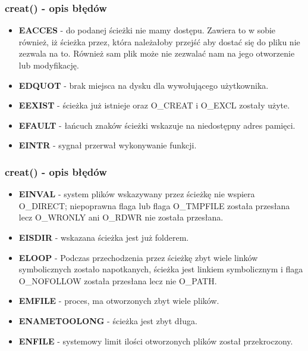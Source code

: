 \documentclass{beamer}
\begin{document}
\begin{frame}
	\frametitle{creat() - opis błędów}
\begin{itemize}
\item \textbf{EACCES} - do podanej ścieżki nie mamy dostępu. Zawiera to w sobie również,
iż ścieżka przez, która należałoby przejść aby dostać się do pliku nie zezwala na to.
Również sam plik może nie zezwalać nam na jego otworzenie lub modyfikację.
\item \textbf{EDQUOT} - brak miejsca na dysku dla wywołującego użytkownika.
\item \textbf{EEXIST} - ścieżka już istnieje oraz O\_CREAT i O\_EXCL zostały użyte.
\item \textbf{EFAULT} - łańcuch znaków ścieżki wskazuje na niedostępny adres pamięci.
\item \textbf{EINTR} - sygnał przerwał wykonywanie funkcji.
\end{itemize}
\end{frame}

\begin{frame}
	\frametitle{creat() - opis błędów}
	\begin{itemize}
\item \textbf{EINVAL} - system plików wskazywany przez ścieżkę nie wspiera O\_DIRECT;
	niepoprawna flaga lub flaga O\_TMPFILE została przesłana lecz O\_WRONLY ani
	O\_RDWR nie została przesłana.
\item \textbf{EISDIR} - wskazana ścieżka jest już folderem.
\item \textbf{ELOOP} - Podczas przechodzenia przez ścieżkę zbyt wiele linków symbolicznych zostało napotkanych, ścieżka jest linkiem symbolicznym i flaga O\_NOFOLLOW została przesłana
	lecz nie O\_PATH.
\item \textbf{EMFILE} - proces, ma otworzonych zbyt wiele plików.
\item \textbf{ENAMETOOLONG} - ścieżka jest zbyt długa.
\item \textbf{ENFILE} - systemowy limit ilości otworzonych plików został przekroczony.
\end{itemize}
\end{frame}
\end{document}
